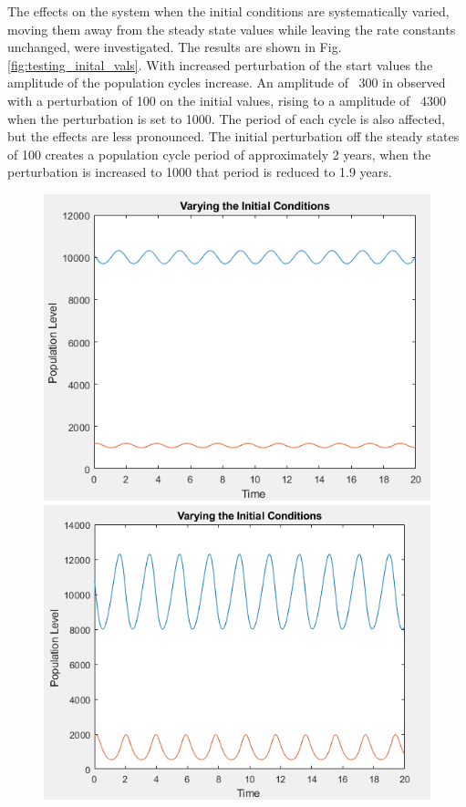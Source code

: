 \documentclass{article}
\begin{document}
The effects on the system when the initial conditions are systematically varied, moving them away from the steady state values while leaving the rate constants unchanged, were investigated. The results are shown in Fig. \ref{fig:testing_inital_vals}. With increased perturbation of the start values the amplitude of the population cycles increase. An amplitude of ~300 in observed with a perturbation of 100 on the initial values, rising to a amplitude of ~4300 when the perturbation is set to 1000.
The period of each cycle is also affected, but the effects are less pronounced. The initial perturbation off the steady states of 100 creates a population cycle period of approximately 2 years, when the perturbation is increased to 1000 that period is reduced to 1.9 years. 

\begin{figure}[H]
    \includegraphics[scale = 0.74]{initial_perb_small.PNG}
    \includegraphics[scale = 0.712]{initial_perb_big.PNG}

\end{figure}
\end{document}
